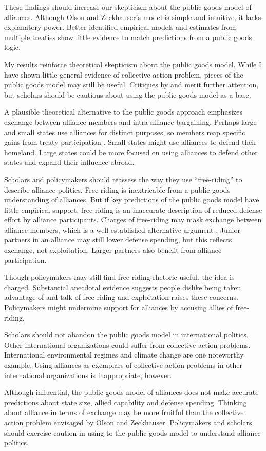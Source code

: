 \documentclass[12pt]{article}
\begin{document}
These findings should increase our skepticism about the public goods model of alliances. 
Although Olson and Zeckhauser's model is simple and intuitive, it lacks explanatory power. 
Better identified empirical models and estimates from multiple treaties show little evidence to match predictions from a public goods logic. 


My results reinforce theoretical skepticism about the public goods model. 
While I have shown little general evidence of collective action problem, pieces of the public goods model may still be useful. 
Critiques by \citet{Palmer1990} and \citet{SandlerHartley2001} merit further attention, but scholars should be cautious about using the public goods model as a base. 


A plausible theoretical alternative to the public goods approach emphasizes exchange between alliance members and intra-alliance bargaining. 
Perhaps large and small states use alliances for distinct purposes, so members reap specific gains from treaty participation \citep{Morrow1991, Johnson2015}. 
Small states might use alliances to defend their homeland. 
Large states could be more focused on using alliances to defend other states and expand their influence abroad. 


Scholars and policymakers should reassess the way they use ``free-riding'' to describe alliance politics. 
Free-riding is inextricable from a public goods understanding of alliances.
But if key predictions of the public goods model have little empirical support, free-riding is an inaccurate description of reduced defense effort by alliance participants.  
Charges of free-riding may mask exchange between alliance members, which is a well-established alternative argument \citep{Norrlof2010, Brooksetal2013, Lanoszka2015, Kim2016}. 
Junior partners in an alliance may still lower defense spending, but this reflects exchange, not exploitation. 
Larger partners also benefit from alliance participation. 


Though policymakers may still find free-riding rhetoric useful, the idea is charged. 
Substantial anecdotal evidence suggests people dislike being taken advantage of and talk of free-riding and exploitation raises these concerns.
Policymakers might undermine support for alliances by accusing allies of free-riding. 


Scholars should not abandon the public goods model in international politics. 
Other international organizations could suffer from collective action problems.
International environmental regimes and climate change are one noteworthy example.  
Using alliances as exemplars of collective action problems in other international organizations is inappropriate, however. 


Although influential, the public goods model of alliances does not make accurate predictions about state size, allied capability and defense spending. 
Thinking about alliance in terms of exchange may be more fruitful than the collective action problem envisaged by Olson and Zeckhauser.
Policymakers and scholars should exercise caution in using to the public goods model to understand alliance politics.  



\singlespace


 
\end{document}
